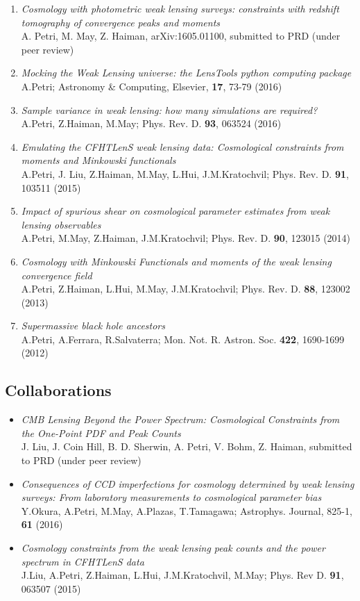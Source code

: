 \documentclass[margin]{res} %
\begin{document}
\begin{resume}
\begin{enumerate}
\item{\sl Cosmology with photometric weak lensing surveys: constraints with redshift tomography of convergence peaks and moments} \\
A. Petri, M. May, Z. Haiman, arXiv:1605.01100, submitted to PRD (under peer review)
\item {\sl Mocking the Weak Lensing universe: the LensTools python computing package} \\
A.Petri; Astronomy \& Computing, Elsevier, \textbf{17}, 73-79 (2016)
\item {\sl Sample variance in weak lensing: how many simulations are required?} \\
A.Petri, Z.Haiman, M.May; Phys. Rev. D. \textbf{93}, 063524 (2016)
\item {\sl Emulating the CFHTLenS weak lensing data: Cosmological constraints from moments and Minkowski functionals} \\
A.Petri, J. Liu, Z.Haiman, M.May, L.Hui, J.M.Kratochvil; Phys. Rev. D. \textbf{91}, 103511 (2015)
\item {\sl Impact of spurious shear on cosmological parameter estimates from weak lensing observables} \\
A.Petri, M.May, Z.Haiman, J.M.Kratochvil; Phys. Rev. D. \textbf{90}, 123015 (2014)
\item {\sl Cosmology with Minkowski Functionals and moments of the weak lensing convergence field} \\
A.Petri, Z.Haiman, L.Hui, M.May, J.M.Kratochvil; Phys. Rev. D. \textbf{88}, 123002 (2013)
\item {\sl Supermassive black hole ancestors} \\
A.Petri, A.Ferrara, R.Salvaterra; Mon. Not. R. Astron. Soc. \textbf{422}, 1690-1699 (2012)

\end{enumerate}

\subsection{Collaborations}

\begin{itemize}

\item {\sl CMB Lensing Beyond the Power Spectrum: Cosmological Constraints from the One-Point PDF and Peak Counts}\\
J. Liu, J. Coin Hill, B. D. Sherwin, A. Petri, V. Bohm, Z. Haiman, submitted to PRD (under peer review)
\item {\sl Consequences of CCD imperfections for cosmology determined by weak lensing surveys: From laboratory measurements to cosmological parameter bias} \\ 
Y.Okura, A.Petri, M.May, A.Plazas, T.Tamagawa; Astrophys. Journal, 825-1, \textbf{61} (2016)
\item {\sl Cosmology constraints from the weak lensing peak counts and the power spectrum in CFHTLenS data} \\ 
J.Liu, A.Petri, Z.Haiman, L.Hui, J.M.Kratochvil, M.May; Phys. Rev D. \textbf{91}, 063507 (2015)
\end{itemize}


\end{resume}
\end{document}
